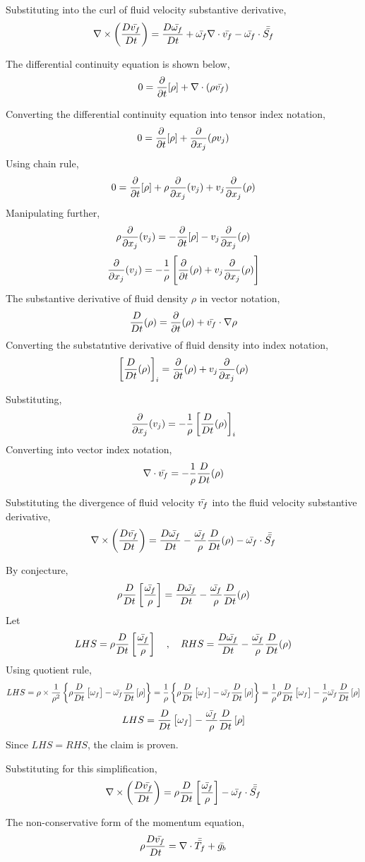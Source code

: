 \documentclass[class=report, 12pt, crop=false]{standalone}
\begin{document}
\begin{center}
Substituting into the curl of fluid velocity substantive derivative,
$$\nabla\times\left(\frac{D \bar{v_f}}{Dt}\right) = \frac{D \bar{\omega_f}}{Dt} + \bar{\omega_f}\nabla\cdot \bar{v_f} - \bar{\omega_f} \cdot \bar{\bar{S_f}}$$


The differential continuity equation is shown below,
$$0 = \frac{\partial}{\partial t}[\rho] + \nabla\cdot(\rho\bar{v_f})$$

Converting the differential continuity equation into tensor index notation,
$$0 = \frac{\partial}{\partial t}[\rho] + \frac{\partial}{\partial x_j}(\rho v_j)$$
Using chain rule,
$$0 = \frac{\partial}{\partial t}[\rho] + \rho\frac{\partial}{\partial x_j}(v_j) + v_j\frac{\partial}{\partial x_j}(\rho)$$
Manipulating further,
$$\rho\frac{\partial}{\partial x_j}(v_j) = -\frac{\partial}{\partial t}[\rho] - v_j\frac{\partial}{\partial x_j}(\rho)$$
$$\frac{\partial}{\partial x_j}(v_j) = -\frac{1}{\rho}\left[\frac{\partial}{\partial t}(\rho) + v_j\frac{\partial}{\partial x_j}(\rho)\right]$$
The substantive derivative of fluid density $\rho$ in vector notation,
$$\frac{D }{Dt}(\rho) = \frac{\partial}{\partial t}(\rho) + \bar{v_f}\cdot\nabla\rho$$
Converting the substatntive derivative of fluid density into index notation,
$$\left[\frac{D }{Dt}(\rho)\right]_i = \frac{\partial}{\partial t}(\rho) + v_j\frac{\partial}{\partial x_j}(\rho)$$

Substituting,
$$\frac{\partial}{\partial x_j}(v_j) = -\frac{1}{\rho}\left[\frac{D }{Dt}(\rho)\right]_i$$
Converting into vector index notation,
$$\nabla\cdot\bar{v_f} = -\frac{1}{\rho}\frac{D }{Dt}(\rho)$$

Substituting the divergence of fluid velocity $\bar{v_f}$ into the fluid velocity substantive derivative,
$$\nabla\times\left(\frac{D \bar{v_f}}{Dt}\right) = \frac{D \bar{\omega_f}}{Dt} - \frac{\bar{\omega_f}}{\rho}\frac{D }{Dt}(\rho) - \bar{\omega_f} \cdot \bar{\bar{S_f}}$$

By conjecture,
$$\rho\frac{D}{Dt}\left[\frac{\bar{\omega_f}}{\rho}\right] = \frac{D \bar{\omega_f}}{Dt} - \frac{\bar{\omega_f}}{\rho}\frac{D }{Dt}(\rho)$$
Let
$$LHS = \rho\frac{D}{Dt}\left[\frac{\bar{\omega_f}}{\rho}\right] \quad,\quad RHS = \frac{D \bar{\omega_f}}{Dt} - \frac{\bar{\omega_f}}{\rho}\frac{D }{Dt}(\rho)$$
Using quotient rule,
$$LHS = \rho\times\frac{1}{\rho^2}\left\{\rho\frac{D}{Dt}\left[\omega_f\right] - \bar{\omega_f}\frac{D}{Dt}\left[\rho\right]\right\} = \frac{1}{\rho}\left\{\rho\frac{D}{Dt}\left[\omega_f\right] - \bar{\omega_f}\frac{D}{Dt}\left[\rho\right]\right\} = \frac{1}{\rho}\rho\frac{D}{Dt}\left[\omega_f\right] - \frac{1}{\rho}\bar{\omega_f}\frac{D}{Dt}\left[\rho\right]$$
$$LHS = \frac{D}{Dt}\left[\omega_f\right] - \frac{\bar{\omega_f}}{\rho}\frac{D}{Dt}\left[\rho\right]$$
Since $LHS = RHS$, the claim is proven. 

Substituting for this simplification,
$$\nabla\times\left(\frac{D \bar{v_f}}{Dt}\right) = \rho\frac{D}{Dt}\left[\frac{\bar{\omega_f}}{\rho}\right] - \bar{\omega_f} \cdot \bar{\bar{S_f}}$$

The non-conservative form of the momentum equation,
$$\rho \frac{D\bar{v_f}}{Dt} = \nabla\cdot\bar{\bar{T_f}} + \bar{g_b}$$


\end{center}
\end{document}
